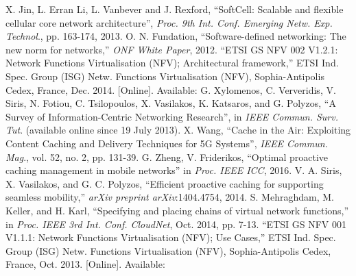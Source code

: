 \documentclass[journal]{IEEEtran}
\begin{document}
\begin{thebibliography}{1}
    X. Jin, L. Erran Li, L. Vanbever and J. Rexford, ``SoftCell: Scalable and flexible cellular core network architecture'', \emph{Proc. 9th Int. Conf. Emerging Netw. Exp. Technol}., pp. 163-174, 2013.
    O. N. Fundation, ``Software-defined networking: The new norm for networks,'' \emph{ONF White Paper}, 2012.
    ``ETSI GS NFV 002 V1.2.1: Network Functions Virtualisation (NFV);
    Architectural framework,'' ETSI Ind. Spec. Group (ISG) Netw. Functions
    Virtualisation (NFV), Sophia-Antipolis Cedex, France, Dec. 2014.
    [Online]. Available: 
    G. Xylomenos, C. Ververidis, V. Siris, N. Fotiou, C. Tsilopoulos, X. Vasilakos, K. Katsaros, and G. Polyzos, ``A Survey of Information-Centric Networking Research'', in \emph{IEEE Commun. Surv. Tut}. (available online since 19 July 2013).
    X. Wang, ``Cache in the Air: Exploiting Content Caching and Delivery Techniques for 5G Systems'', \emph{IEEE Commun. Mag}., vol. 52, no. 2, pp. 131-39.
    G. Zheng, V. Friderikos, ``Optimal proactive caching management in mobile networks'' in \emph{Proc. IEEE ICC}, 2016.
    V. A. Siris, X. Vasilakos, and G. C. Polyzos, ``Efficient proactive caching for supporting seamless mobility,'' \emph{arXiv preprint arXiv}:1404.4754, 2014.
    S. Mehraghdam, M. Keller, and H. Karl, ``Specifying and placing chains of virtual network functions,'' in \emph{Proc. IEEE 3rd Int. Conf. CloudNet}, Oct. 2014, pp. 7-13.
    ``ETSI GS NFV 001 V1.1.1: Network Functions Virtualisation (NFV);
    Use Cases,'' ETSI Ind. Spec. Group (ISG) Netw. Functions
    Virtualisation (NFV), Sophia-Antipolis Cedex, France, Oct. 2013.
    [Online]. Available: 
  \end{thebibliography}
\end{document}
